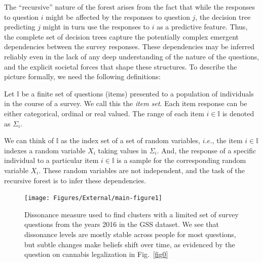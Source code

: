 \documentclass[onecolumn, compsoc,11pt]{IEEEtran}
\renewcommand{\captionN}[1]{\caption{\color{CadetBlue4!80!black} \sffamily \fontsize{10}{11}\selectfont #1  }}
\newif\iftikzX
\begin{document}
The ``recursive'' nature of the forest arises from the fact that while the responses to  question $i$ might be affected by the responses to question $j$, the decision tree predicting $j$ might in turn use the responses to  $i$ as a predictive feature. Thus, the complete set of decision trees capture the potentially complex emergent dependencies between the survey responses. These dependencies may be inferred reliably even in the lack of any deep understanding of the nature of the questions, and the explicit societal forces that shape these structures. To describe the picture  formally, we need the following definitions:
%
\def\I{\mathds{I}}
\def\D{\mathfrak{D}}
\def\Q{\mathds{Q}}
\def\R{X}
\def\supp{\mathop{\mathsf{supp}}}
\def\u{\boldsymbol{u}}
\begin{defn}
Let $\I$ be a finite set of questions (items) presented to a population of individuals in the course of a survey. We call this the \textit{item set}.  Each item response can be either categorical, ordinal or real valued. The
range of each item $i \in \I$ is denoted as $\Sigma_i$. 
\end{defn}
%
We can think of $\I$ as the index set of a set of random variables, $i.e.$, the item $i \in \I$ indexes a random variable $X_i$ taking values in $\Sigma_i$. And, the response of a specific individual to a particular item $i \in \I$ is  a sample for the corresponding random  variable $X_i$. These random variables are not independent, and the task of the recursive forest is to infer these dependencies.
\begin{figure}[!t]
  \vspace{-10pt}
  
\iftikzX
    \hspace{-25pt}

  \vspace{-22pt}
  \else \texttt{[image: Figures/External/main-figure1]}
  \vspace{-15pt}
  \fi

  
  \captionN{Dissonance measure used to find clusters with a limited set of survey questions from the years 2016  in the GSS dataset. We see that dissonance levels are mostly stable across people for most questions, but subtle changes make beliefs shift over time, as evidenced by the question on cannabis legalization in Fig.~\ref{fig0}}\label{fig1}
  \vspace{-20pt}
  
\end{figure}
\end{document}
